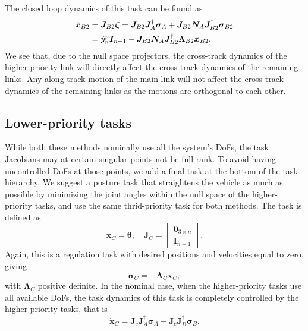 \documentclass[../main.tex]{subfiles}
\begin{document}
The closed loop dynamics of this task can be found as
\begin{align}
    \label{eq:cross_track_task_dyn}
    \dot{\bm{x}}_{B2} &= \bm{J}_{B2} \bm{\zeta} = \bm{J}_{B2}\bm{J}_A^{\dagger}\bm{\sigma}_A  + \bm{J}_{B2} \bm{N}_A \bm{J}_{B2}^\dagger \bm{\sigma}_{B2}\\
    &= \dot{y}^p_n \bm{I}_{n-1} -\bm{J}_{B2} \bm{N}_A \bm{J}_{B2}^\dagger \bm{\Lambda}_{B2} \bm{x}_{B2}. \notag
\end{align}
We see that, due to the null space projectors, the cross-track dynamics of the higher-priority link will directly affect the cross-track dynamics of the remaining links. Any along-track motion of the main link will not affect the cross-track dynamics of the remaining links as the motions are orthogonal to each other.


\subsection{Lower-priority tasks}
While both these methods nominally use all the system's DoFs, the task Jacobians may at certain singular points not be full rank. To avoid having uncontrolled DoFs at those points, we add a final task at the bottom of the task hierarchy. We suggest a posture task that straightens the vehicle as much as possible by minimizing the joint angles within the null space of the higher-priority tasks, and use the same thrid-priority task for both methods. The task is defined as
\begin{equation}
    \bm{x}_C = \bm{\theta}, \quad
    \bm{J}_C = \begin{bmatrix}
        \bm{0}_{3 \times n} \\ \bm{I}_{n-1}
    \end{bmatrix}.
\end{equation}
Again, this is a regulation task with desired positions and velocities equal to zero, giving
\begin{equation}
    \bm{\sigma}_{C} = - \bm{\Lambda}_C \bm{x}_C,
\end{equation}
with $\bm{\Lambda}_C$ positive definite. In the nominal case, when the higher-priority tasks use all available DoFs, the task dynamics of this task is completely controlled by the higher priority tasks, that is
\begin{equation}
    \dot{\bm{x}}_C = \bm{J}_c \bm{J}_A^{\dagger} \bm{\sigma}_A +\bm{J}_c \bm{J}_B^{\dagger} \bm{\sigma}_B.
\end{equation}
\end{document}
